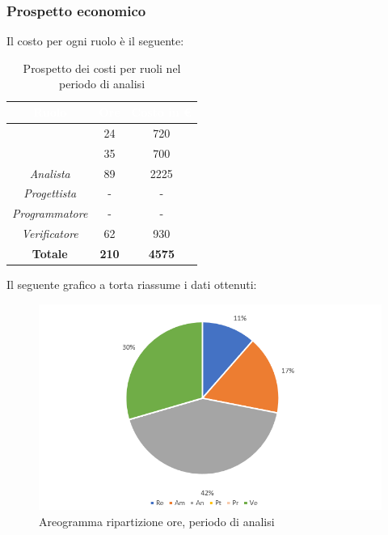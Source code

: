 \subsubsection{Prospetto economico}
Il costo per ogni ruolo è il seguente:
\begin{table}[H]
	\begin{center}
		\begin{tabular}{ |c c c| }
		\rowcolor{darkblue} 
		\textcolor{white}{\textbf{Ruolo}} & \textcolor{white}{\textbf{Ore}} & \textcolor{white}{\textbf{Costo in €}}\\ \hline
		{\Responsabile} 			& 24 	& 720 \\ \hline
		{\Amministratore} 			& 35 	& 700 \\ \hline
		\textit{Analista} 			& 89 	& 2225 \\ \hline
		\textit{Progettista} 		& - 	& - \\ \hline
		\textit{Programmatore}  	& - 	& - \\ \hline
		\textit{Verificatore} 		& 62 	& 930 \\ \hline
		\textbf{Totale} 			& \textbf{210} & \textbf{4575} \\ \hline
		\end{tabular}
	\caption{Prospetto dei costi per ruoli nel periodo di analisi}
	\end{center}
\end{table}
Il seguente grafico a torta riassume i dati ottenuti:
\begin{figure}[H]
    \centering
    \includegraphics[scale = 0.75]{Immagini/AnalisiTorta.png}
    \caption{Areogramma ripartizione ore, periodo di analisi}
    \label{fig:Areogramma ripartizione ore, periodo di Analisi}
\end{figure}
\newpage

